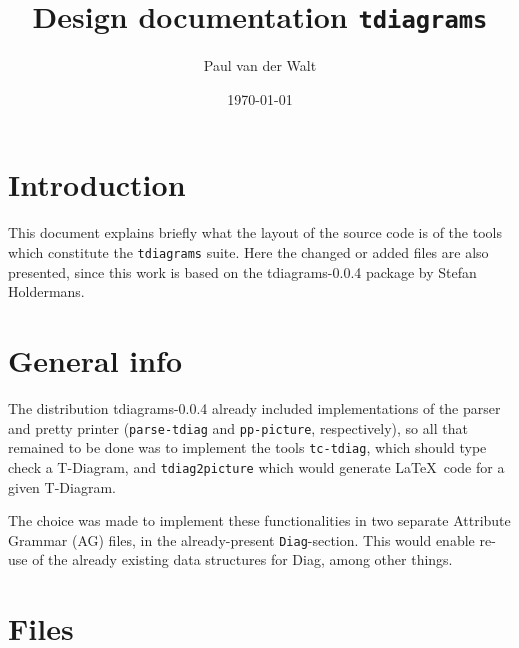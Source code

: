 \documentclass[a4paper]{article}
\title{Design documentation \texttt{tdiagrams}}
\date{\today}
\author{Paul van der Walt}
\begin{document}
\maketitle

\section{Introduction}

This document explains briefly what the layout of the source code is of the
tools which constitute the \texttt{tdiagrams} suite. Here the changed or added
files are also presented, since this work is based on the tdiagrams-0.0.4
package by Stefan Holdermans. 

\section{General info}

The distribution tdiagrams-0.0.4 already included implementations of the parser and pretty printer (\texttt{parse-tdiag} and \texttt{pp-picture}, respectively), so all that remained to be done was to implement the tools \texttt{tc-tdiag}, which should type check a T-Diagram, and \texttt{tdiag2picture} which would generate \LaTeX\ code for a given T-Diagram.

The choice was made to implement these functionalities in two separate Attribute Grammar (AG) files, in the already-present \texttt{Diag}-section. This would enable re-use of the already existing data structures for Diag, among other things. 


\section{Files}
\end{document}

